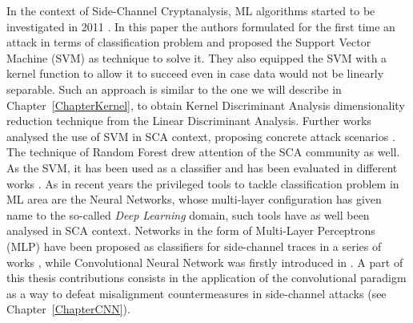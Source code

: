 In the context of Side-Channel Cryptanalysis, ML algorithms started to be investigated in 2011 \cite{machineLearningSCA}. In this paper the authors formulated for the first time an attack in terms of classification problem and proposed the Support Vector Machine (SVM) \cite{cortes1995support,weston1998multi} as technique to solve it. They also equipped the SVM with a kernel function to allow it to succeed even in case data would not be linearly separable. Such an approach is similar to the one we will describe in Chapter~\ref{ChapterKernel}, to obtain Kernel Discriminant Analysis dimensionality reduction technique from the Linear Discriminant Analysis. Further works analysed the use of SVM in SCA context, proposing concrete attack scenarios \cite{intelligentMachineOmicide,effTA_SVM}. 
The technique of Random Forest \cite{lior2014data} drew attention of the SCA community as well. As the SVM, it has been used as a classifier and has been evaluated in different works \cite{lerman2015machine,lerman2015template,lerman2014power}. As in recent years the privileged tools to tackle classification problem in ML area are the Neural Networks, whose multi-layer configuration has given name to the so-called \emph{Deep Learning} domain, such tools have as well been analysed in SCA context. Networks in the form of Multi-Layer Perceptrons (MLP) have been proposed as classifiers for side-channel traces in a series of works \cite{martinasek2013optimization,martinasek2013innovative,martinasek2015profiling,martinasek2016profiling}, while Convolutional Neural Network was firstly introduced in \cite{maghrebi2016breaking}. A part of this thesis contributions consists in the application of the convolutional paradigm as a way to defeat misalignment countermeasures in side-channel attacks (see Chapter~\ref{ChapterCNN}).


